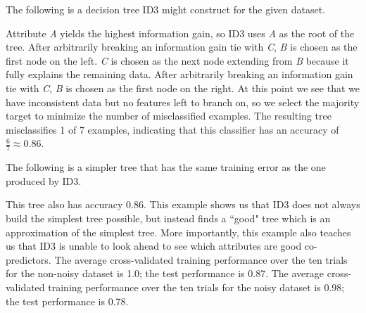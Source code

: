 \documentclass[solution, letterpaper]{cs121}
\begin{document}
\subproblem The following is a decision tree ID3 might construct for the given dataset.

\begin{center}
\end{center}

Attribute \emph{A} yields the highest information gain, so ID3 uses \emph{A} as the root of the tree. After arbitrarily breaking an information gain tie with \emph{C}, \emph{B} is chosen as the first node on the left. \emph{C} is chosen as the next node extending from \emph{B} because it fully explains the remaining data. After arbitrarily breaking an information gain tie with \emph{C}, \emph{B} is chosen as the first node on the right. At this point we see that we have inconsistent data but no features left to branch on, so we select the majority target to minimize the number of misclassified examples. The resulting tree misclassifies 1 of 7 examples, indicating that this classifier has an accuracy of $\frac{6}{7} \approx 0.86$.


\subproblem The following is a simpler tree that has the same training error as the one produced by ID3.

\begin{center}
\end{center}

This tree also has accuracy 0.86. This example shows us that ID3 does not always build the simplest tree possible, but instead finds a ``good" tree which is an approximation of the simplest tree. More importantly, this example also teaches us that ID3 is unable to look ahead to see which attributes are good co-predictors. 
\pagebreak
\subproblem The average cross-validated training performance over the ten trials for the non-noisy dataset is 1.0; the test performance is 0.87. The average cross-validated training performance over the ten trials for the noisy dataset is 0.98; the test performance is 0.78.
\subproblem
 
\end{document}
